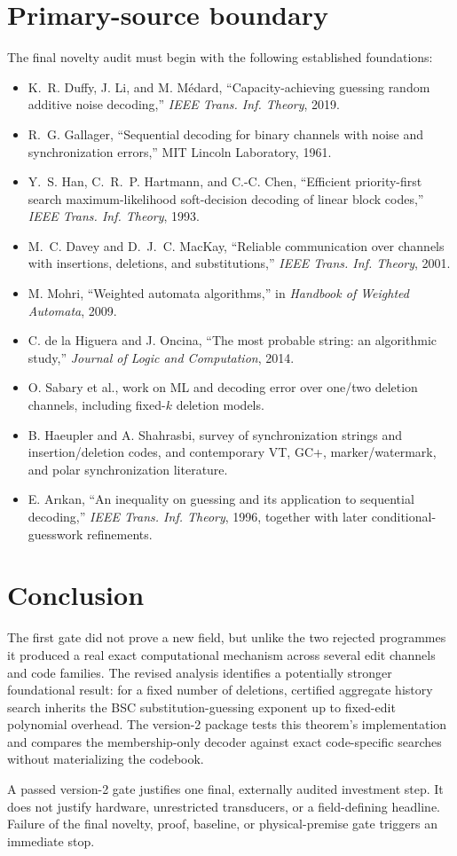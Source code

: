 \documentclass[11pt]{article}
\theoremstyle{definition}
\theoremstyle{remark}
\begin{document}
\section{Primary-source boundary}
The final novelty audit must begin with the following established foundations:
\begin{itemize}[leftmargin=2em]
\item K.~R. Duffy, J. Li, and M. M\'edard, ``Capacity-achieving guessing random additive noise decoding,'' \emph{IEEE Trans. Inf. Theory}, 2019.
\item R.~G. Gallager, ``Sequential decoding for binary channels with noise and synchronization errors,'' MIT Lincoln Laboratory, 1961.
\item Y.~S. Han, C.~R.~P. Hartmann, and C.-C. Chen, ``Efficient priority-first search maximum-likelihood soft-decision decoding of linear block codes,'' \emph{IEEE Trans. Inf. Theory}, 1993.
\item M.~C. Davey and D.~J.~C. MacKay, ``Reliable communication over channels with insertions, deletions, and substitutions,'' \emph{IEEE Trans. Inf. Theory}, 2001.
\item M. Mohri, ``Weighted automata algorithms,'' in \emph{Handbook of Weighted Automata}, 2009.
\item C. de la Higuera and J. Oncina, ``The most probable string: an algorithmic study,'' \emph{Journal of Logic and Computation}, 2014.
\item O. Sabary et al., work on ML and decoding error over one/two deletion channels, including fixed-$k$ deletion models.
\item B. Haeupler and A. Shahrasbi, survey of synchronization strings and insertion/deletion codes, and contemporary VT, GC+, marker/watermark, and polar synchronization literature.
\item E. Ar\i kan, ``An inequality on guessing and its application to sequential decoding,'' \emph{IEEE Trans. Inf. Theory}, 1996, together with later conditional-guesswork refinements.
\end{itemize}

\section{Conclusion}
The first gate did not prove a new field, but unlike the two rejected programmes it produced a real exact computational mechanism across several edit channels and code families.  The revised analysis identifies a potentially stronger foundational result: for a fixed number of deletions, certified aggregate history search inherits the BSC substitution-guessing exponent up to fixed-edit polynomial overhead.  The version-2 package tests this theorem's implementation and compares the membership-only decoder against exact code-specific searches without materializing the codebook.

A passed version-2 gate justifies one final, externally audited investment step.  It does not justify hardware, unrestricted transducers, or a field-defining headline.  Failure of the final novelty, proof, baseline, or physical-premise gate triggers an immediate stop.
\end{document}
